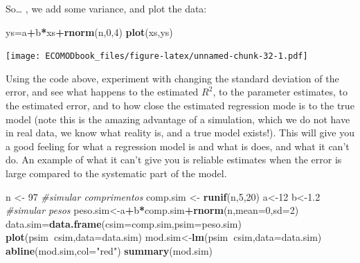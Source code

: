 \documentclass[
]{book}
\newenvironment{Shaded}{\begin{snugshade}}{\end{snugshade}}
\newcommand{\CommentTok}[1]{\textcolor[rgb]{0.56,0.35,0.01}{\textit{#1}}}
\newcommand{\DataTypeTok}[1]{\textcolor[rgb]{0.13,0.29,0.53}{#1}}
\newcommand{\DecValTok}[1]{\textcolor[rgb]{0.00,0.00,0.81}{#1}}
\newcommand{\FloatTok}[1]{\textcolor[rgb]{0.00,0.00,0.81}{#1}}
\newcommand{\KeywordTok}[1]{\textcolor[rgb]{0.13,0.29,0.53}{\textbf{#1}}}
\newcommand{\NormalTok}[1]{#1}
\newcommand{\OperatorTok}[1]{\textcolor[rgb]{0.81,0.36,0.00}{\textbf{#1}}}
\newcommand{\StringTok}[1]{\textcolor[rgb]{0.31,0.60,0.02}{#1}}
\begin{document}
So\ldots{} , we add some variance, and plot the data:

\begin{Shaded}
\begin{Highlighting}[]
\NormalTok{ys=a}\OperatorTok{+}\NormalTok{b}\OperatorTok{*}\NormalTok{xs}\OperatorTok{+}\KeywordTok{rnorm}\NormalTok{(n,}\DecValTok{0}\NormalTok{,}\DecValTok{4}\NormalTok{)}
\KeywordTok{plot}\NormalTok{(xs,ys)}
\end{Highlighting}
\end{Shaded}

\texttt{[image: ECOMODbook\_files/figure-latex/unnamed-chunk-32-1.pdf]}

Using the code above, experiment with changing the standard deviation of the error, and see what happens to the estimated \(R^2\), to the parameter estimates, to the estimated error, and to how close the estimated regression mode is to the true model (note this is the amazing advantage of a simulation, which we do not have in real data, we know what reality is, and a true model exists!). This will give you a good feeling for what a regression model is and what is does, and what it can't do. An example of what it can't give you is reliable estimates when the error is large compared to the systematic part of the model.

\begin{Shaded}
\begin{Highlighting}[]
\NormalTok{n <-}\StringTok{ }\DecValTok{97}
\CommentTok{#simular comprimentos}
\NormalTok{comp.sim <-}\StringTok{ }\KeywordTok{runif}\NormalTok{(n,}\DecValTok{5}\NormalTok{,}\DecValTok{20}\NormalTok{)}
\NormalTok{a<-}\DecValTok{12}
\NormalTok{b<-}\FloatTok{1.2}
\CommentTok{#simular pesos}
\NormalTok{peso.sim<-a}\OperatorTok{+}\NormalTok{b}\OperatorTok{*}\NormalTok{comp.sim}\OperatorTok{+}\KeywordTok{rnorm}\NormalTok{(n,}\DataTypeTok{mean=}\DecValTok{0}\NormalTok{,}\DataTypeTok{sd=}\DecValTok{2}\NormalTok{)}
\NormalTok{data.sim=}\KeywordTok{data.frame}\NormalTok{(}\DataTypeTok{csim=}\NormalTok{comp.sim,}\DataTypeTok{psim=}\NormalTok{peso.sim)}
\KeywordTok{plot}\NormalTok{(psim}\OperatorTok{~}\NormalTok{csim,}\DataTypeTok{data=}\NormalTok{data.sim)}
\NormalTok{mod.sim<-}\KeywordTok{lm}\NormalTok{(psim}\OperatorTok{~}\NormalTok{csim,}\DataTypeTok{data=}\NormalTok{data.sim)}
\KeywordTok{abline}\NormalTok{(mod.sim,}\DataTypeTok{col=}\StringTok{"red"}\NormalTok{)}
\KeywordTok{summary}\NormalTok{(mod.sim)}
\end{Highlighting}
\end{Shaded}
\end{document}
